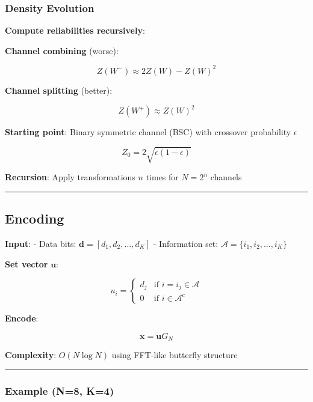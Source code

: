 \subsubsection{Density Evolution}\label{density-evolution}

\textbf{Compute reliabilities recursively}:

\textbf{Channel combining} (worse):

\[
Z(W^-) \approx 2Z(W) - Z(W)^2
\]

\textbf{Channel splitting} (better):

\[
Z(W^+) \approx Z(W)^2
\]

\textbf{Starting point}: Binary symmetric channel (BSC) with crossover
probability \(\epsilon\)

\[
Z_0 = 2\sqrt{\epsilon(1-\epsilon)}
\]

\textbf{Recursion}: Apply transformations \(n\) times for \(N = 2^n\)
channels

\begin{center}\rule{0.5\linewidth}{0.5pt}\end{center}

\subsection{Encoding}\label{encoding}

\textbf{Input}: - Data bits: \(\mathbf{d} = [d_1, d_2, \ldots, d_K]\) -
Information set: \(\mathcal{A} = \{i_1, i_2, \ldots, i_K\}\)

\textbf{Set vector} \(\mathbf{u}\):

\[
u_i = \begin{cases}
d_j & \text{if } i = i_j \in \mathcal{A} \\
0 & \text{if } i \in \mathcal{A}^c
\end{cases}
\]

\textbf{Encode}:

\[
\mathbf{x} = \mathbf{u} G_N
\]

\textbf{Complexity}: \(O(N \log N)\) using FFT-like butterfly structure

\begin{center}\rule{0.5\linewidth}{0.5pt}\end{center}

\subsubsection{Example (N=8, K=4)}\label{example-n8-k4}

